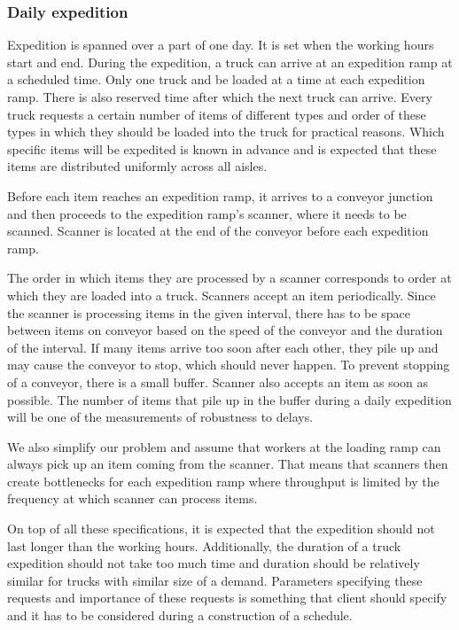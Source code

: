 \documentclass{ctuthesis}
\begin{document}
\subsubsection{Daily expedition}
Expedition is spanned over a part of one day. It is set when the working hours start and end. During the expedition, a truck can arrive at an expedition ramp at a scheduled time. Only one truck and be loaded at a time at each expedition ramp. There is also reserved time after which the next truck can arrive. Every truck requests a certain number of items of different types and order of these types in which they should be loaded into the truck for practical reasons. Which specific items will be expedited is known in advance and is expected that these items are distributed uniformly across all aisles. 

Before each item reaches an expedition ramp, it arrives to a conveyor junction and then proceeds to the expedition ramp's scanner, where it needs to be scanned. Scanner is located at the end of the conveyor before each expedition ramp. 

The order in which items they are processed by a scanner corresponds to order at which they are loaded into a truck. Scanners accept an item periodically. Since the scanner is processing items in the given interval, there has to be space between items on conveyor based on the speed of the conveyor and the duration of the interval. If many items arrive too soon after each other, they pile up and may cause the conveyor to stop, which should never happen. To prevent stopping of a conveyor, there is a small buffer. Scanner also accepts an item as soon as possible. The number of items that pile up in the buffer during a daily expedition will be one of the measurements of robustness to delays.

We also simplify our problem and assume that workers at the loading ramp can always pick up an item coming from the scanner. That means that scanners then create bottlenecks for each expedition ramp where throughput is limited by the frequency at which scanner can process items.

On top of all these specifications, it is expected that the expedition should not last longer than the working hours. Additionally, the duration of a truck expedition should not take too much time and duration should be relatively similar for trucks with similar size of a demand. Parameters specifying these requests and importance of these requests is something that client should specify and it has to be considered during a construction of a schedule.
\end{document}

